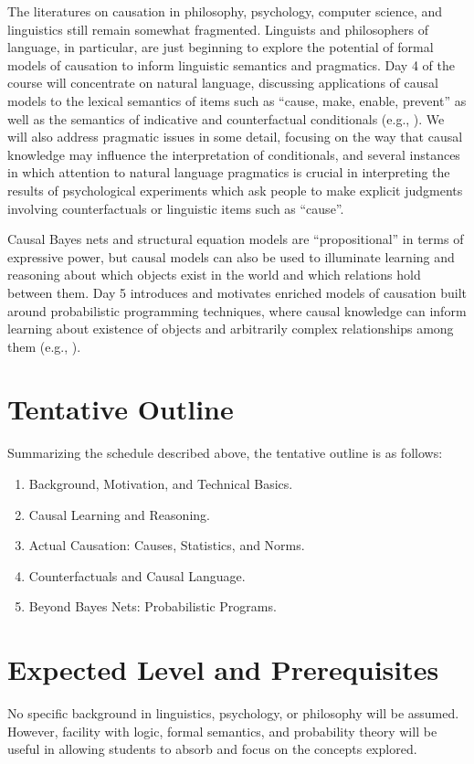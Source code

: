\documentclass[english]{article}
\begin{document}
The literatures on causation in philosophy, psychology, computer science, and linguistics still remain somewhat fragmented. Linguists and philosophers of language, in particular, are just beginning to explore the potential of formal models of causation to inform linguistic semantics and pragmatics. Day 4 of the course will concentrate on natural language, discussing applications of causal models to the lexical semantics of items such as ``cause, make, enable, prevent'' \citep{wolff03,sloman09} as well as the semantics of indicative and counterfactual conditionals (e.g., \citealt{pearl00,schulz07,sloman05b,deghanietal12,kaufmann13}). We will also address pragmatic issues in some detail, focusing on the way that causal knowledge may influence the interpretation of conditionals, and several instances in which attention to natural language pragmatics is crucial in interpreting the results of psychological experiments which ask people to make explicit judgments involving counterfactuals or linguistic items such as ``cause''.

Causal Bayes nets and structural equation models are ``propositional'' in terms of expressive power, but causal models can also be used to illuminate learning and reasoning about which objects exist in the world and which relations hold between them. Day 5 introduces and motivates enriched models of causation built around probabilistic programming techniques, where causal knowledge can inform learning about existence of objects and arbitrarily complex relationships among them (e.g., \citealt{goodmanetal08,gerstenberg17}). 

\section*{\large{Tentative Outline}}

Summarizing the schedule described above, the tentative outline is as follows:

\normalsize{
\begin{enumerate}
  \item Background, Motivation, and Technical Basics.
  \item Causal Learning and Reasoning.
  \item Actual Causation: Causes, Statistics, and Norms.
  \item Counterfactuals and Causal Language.
  \item Beyond Bayes Nets: Probabilistic Programs.
\end{enumerate}
}

\section*{\large{Expected Level and Prerequisites}}
No specific background in linguistics, psychology, or philosophy will be assumed. However, facility with logic, formal semantics, and probability theory will be useful in allowing students to absorb and focus on the concepts explored. 



 
\end{document}

